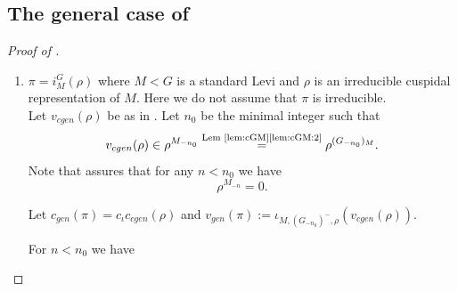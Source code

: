 \documentclass[12pt,a4paper]{amsart}%
\begin{document}
\subsection{The general case of  }


    

\begin{proof}[Proof of ]
$ $
\begin{enumerate}[{Case} 1.]

    \item $\pi=i_M^G(\rho)$  where $M<G$ is a standard Levi and  $\rho$ is an irreducible cuspidal representation of $M$. Here we do not assume that $\pi$ is irreducible.\\

    Let $v_{cgen}(\rho)$ be as in
    .
    Let $n_0$ be the minimal integer  such that     
    $$v_{cgen}(\rho)\in \rho^{M_{-n_0}}\overset{\text{Lem \ref{lem:cGM}\eqref{lem:cGM:2}}}{=}\rho^{(G_{-n_0})_M}.$$  
Note that    assures that for any $n<n_0$ we have
\begin{equation}\label{eq:rho.M.van}
\rho^{M_{-n}}=0.    
\end{equation}

    
    Let $c_{gen}(\pi)=c_{\iota}c_{cgen}(\rho)$
and $v_{gen}(\pi):=\iota_{M,(G_{-n_0})^-,\rho}(v_{cgen}(\rho))$.

For $n<n_0$ we have 


\end{enumerate}
\end{proof}
\end{document}
